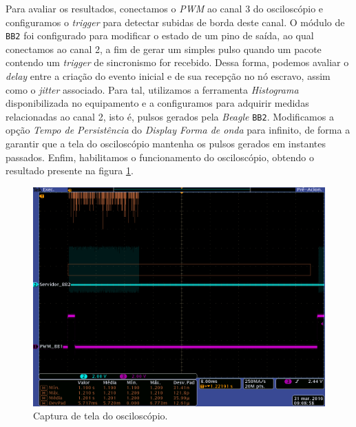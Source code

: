 Para avaliar os resultados, conectamos o \textit{PWM} ao canal 3 do osciloscópio
e configuramos o \textit{trigger} para detectar subidas de borda deste canal. O
módulo de \texttt{BB2} foi configurado para modificar o estado de um pino de
saída, ao qual conectamos ao canal 2, a fim de gerar um simples pulso quando um
pacote contendo um \textit{trigger} de sincronismo for recebido. Dessa forma,
podemos avaliar o \textit{delay} entre a criação do evento inicial e de sua
recepção no nó escravo, assim como o \textit{jitter} associado. Para tal,
utilizamos a ferramenta \textit{Histograma} disponibilizada no equipamento e a
configuramos para adquirir medidas relacionadas ao canal 2, isto é, pulsos
gerados pela \textit{Beagle} \texttt{BB2}. Modificamos a opção \textit{Tempo de
Persistência} do \textit{Display Forma de onda} para infinito, de forma a
garantir que a tela do osciloscópio mantenha os pulsos gerados em instantes
passados. Enfim, habilitamos o funcionamento do osciloscópio, obtendo o
resultado presente na figura \ref{fig:osciloscopio_thread}.

\FloatBarrier

\begin{figure}[h]

\centering
\includegraphics[scale=0.35]{image/tek_com_threads}
\caption {Captura de tela do osciloscópio.}
\label{fig:osciloscopio_thread}
\end{figure}

\FloatBarrier

